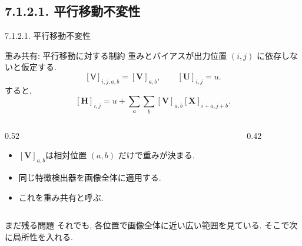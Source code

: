 \documentclass[dvipdfmx,uplatex,unicode,9pt,aspectratio=169]{beamer}
\newcommand{\X}{\mathbf{X}}
\newcommand{\Hid}{\mathbf{H}}
\newcommand{\V}{\mathbf{V}}
\newcommand{\Vten}{\mathsf{V}}
\newcommand{\U}{\mathbf{U}}
\begin{document}
\subsection{7.1.2.1. 平行移動不変性}
\begin{frame}{7.1.2.1. 平行移動不変性}
\begin{block}{重み共有: 平行移動に対する制約}
重みとバイアスが出力位置 $(i,j)$ に依存しないと仮定する.
\[
  [\Vten]_{i,j,a,b}=[\V]_{a,b},
  \qquad
  [\U]_{i,j}=u.
\]
すると,
\[
  [\Hid]_{i,j}
  =u+\sum_a\sum_b [\V]_{a,b}[\X]_{i+a,j+b}.
\]
\end{block}
\begin{columns}[T,totalwidth=\textwidth]
\begin{column}{0.52\textwidth}
\begin{itemize}
  \item $[\V]_{a,b}$は相対位置 $(a,b)$ だけで重みが決まる.
  \item 同じ特徴検出器を画像全体に適用する.
  \item これを\alert{重み共有}と呼ぶ.
\end{itemize}
\end{column}
\begin{column}{0.42\textwidth}
\centering
{}
\end{column}
\end{columns}
\begin{block}{まだ残る問題}
それでも, 各位置で画像全体に近い広い範囲を見ている. そこで次に局所性を入れる.
\end{block}
\end{frame}
\end{document}
